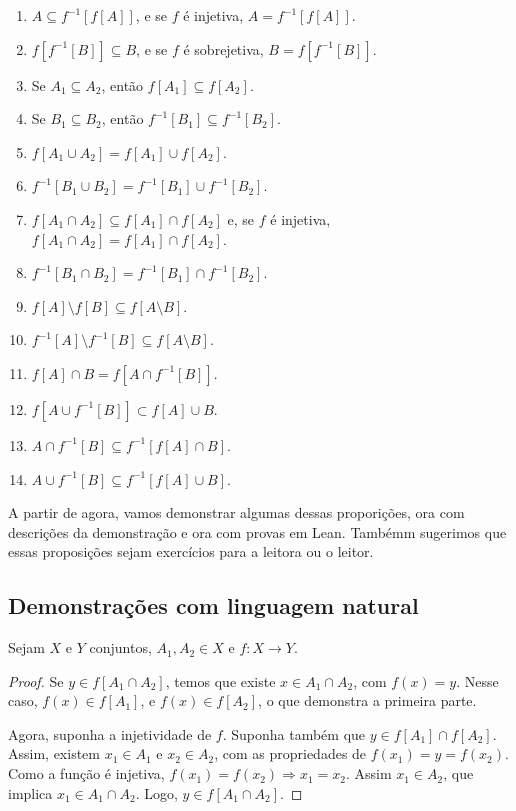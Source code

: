 \begin{enumerate}
    \item $A \subseteq f^{-1}[f[A]]$, e se $f$ é injetiva, $A = f^{-1}[f[A]]$.
    \item $f[f^{-1}[B]] \subseteq B$, e se $f$ é sobrejetiva, $B = f[f^{-1}[B]]$.
    \item Se $A_1 \subseteq A_2$, então $f[A_1] \subseteq f[A_2]$.
    \item Se $B_1 \subseteq B_2$, então $f^{-1}[B_1] \subseteq f^{-1}[B_2]$.
    \item $f[A_1 \cup A_2] = f[A_1] \cup f[A_2]$.
    \item $f^{-1}[B_1 \cup B_2] = f^{-1}[B_1] \cup f^{-1}[B_2]$.
    \item $f[A_1 \cap A_2] \subseteq f[A_1] \cap f[A_2]$ e, se $f$ é injetiva, $f[A_1 \cap A_2] = f[A_1] \cap f[A_2]$.
    \item $f^{-1}[B_1 \cap B_2] = f^{-1}[B_1] \cap f^{-1}[B_2]$.
    \item $f[A] \setminus f[B] \subseteq f[A\setminus B]$.
    \item $f^{-1}[A] \setminus f^{-1}[B] \subseteq f[A \setminus B]$.
    \item $f[A] \cap B = f[A \cap f^{-1}[B]]$.
    \item $f[A \cup f^{-1}[B]] \subset f[A] \cup B $.
    \item $A \cap f^{-1}[B] \subseteq f^{-1}[f[A] \cap B]$.
    \item $A \cup f^{-1}[B] \subseteq f^{-1}[f[A] \cup B]$.
\end{enumerate}

A partir de agora, vamos demonstrar algumas dessas proporições, ora 
com descrições da demonstração e ora com provas em Lean. Tambémm sugerimos
que essas proposições sejam exercícios para a leitora ou o leitor. 

\subsection{Demonstrações com linguagem natural}

\begin{theorem}[Item 7]
    \label{exerc1}
    Sejam $X$ e $Y$ conjuntos, $A_1, A_2 \in X$ e $f: X \to Y$.
\end{theorem}

\begin{proof}
    Se $y \in f[A_1 \cap A_2]$, temos que existe $x \in A_1 \cap A_2$, com $f(x) = y$. 
    Nesse caso, $f(x) \in f[A_1]$, e $f(x) \in f[A_2]$, o que demonstra a primeira parte. 

    Agora, suponha a injetividade de $f$. Suponha também que $y \in f[A_1] \cap f[A_2]$. Assim, existem 
    $x_1 \in A_1$ e $x_2 \in A_2$, com as propriedades de $f(x_1) = y = f(x_2)$. Como a função é injetiva, 
    $f(x_1) = f(x_2) \Rightarrow x_1 = x_2$. Assim $x_1 \in A_2$, que implica $x_1 \in A_1 \cap A_2$. Logo, 
    $y \in f[A_1 \cap A_2]$.
\end{proof}


